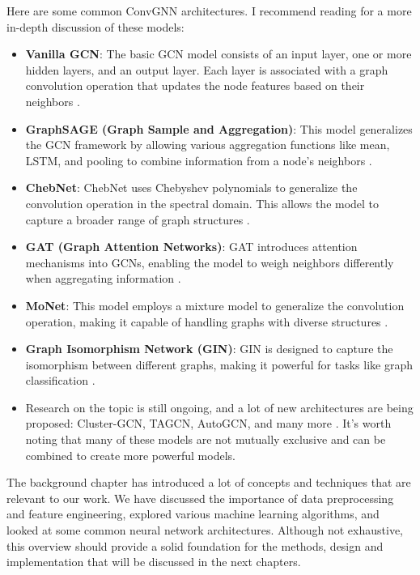     Here are some common ConvGNN architectures. I recommend reading  \cite{GCNAutoFiltering22} for a more in-depth discussion of these models:

    \begin{itemize}
        \item \textbf{Vanilla GCN}: The basic GCN model consists of an input layer, one or more hidden layers, and an output layer. Each layer is associated with a graph convolution operation that updates the node features based on their neighbors \cite{KG22}.
        
        \item \textbf{GraphSAGE (Graph Sample and Aggregation)}: This model generalizes the GCN framework by allowing various aggregation functions like mean, LSTM, and pooling to combine information from a node's neighbors \cite{GraphSAGE17}.
        
        \item \textbf{ChebNet}: ChebNet uses Chebyshev polynomials to generalize the convolution operation in the spectral domain. This allows the model to capture a broader range of graph structures \cite{GNNComprehensiveSurvey20}.
        
        \item \textbf{GAT (Graph Attention Networks)}: GAT introduces attention mechanisms into GCNs, enabling the model to weigh neighbors differently when aggregating information \cite{GAT17}.
        
        \item \textbf{MoNet}: This model employs a mixture model to generalize the convolution operation, making it capable of handling graphs with diverse structures \cite{MoNet17}.
        
        \item \textbf{Graph Isomorphism Network (GIN)}: GIN is designed to capture the isomorphism between different graphs, making it powerful for tasks like graph classification \cite{GCNAutoFiltering22}.
        
        \item Research on the topic is still ongoing, and a lot of new architectures are being proposed: Cluster-GCN, TAGCN, AutoGCN, and many more \cite{GCNAutoFiltering22}. It's worth noting that many of these models are not mutually exclusive and can be combined to create more powerful models.
    \end{itemize}

    The background chapter has introduced a lot of concepts and techniques that are relevant to our work. We have discussed the importance of data preprocessing and feature engineering, explored various machine learning algorithms, and looked at some common neural network architectures. Although not exhaustive, this overview should provide a solid foundation for the methods, design and implementation that will be discussed in the next chapters.

